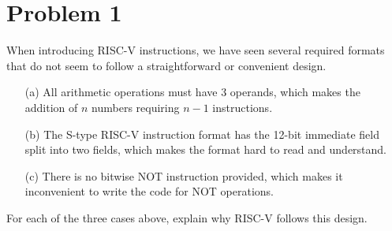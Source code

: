 \documentclass[12pt]{article}
\begin{document}
    \section*{Problem 1}
        \noindent When introducing RISC-V instructions, we have seen several
        required formats that do not seem to follow a straightforward or
        convenient design.
        \begin{itemize}
            \item[(a)] All arithmetic operations must have 3 operands, which
                makes the addition of $n$ numbers requiring $n-1$
                instructions.
            \item[(b)] The S-type RISC-V instruction format has the 12-bit
                immediate field split into two fields, which makes the format
                hard to read and understand.
            \item[(c)] There is no bitwise NOT instruction provided, which makes
                it inconvenient to write the code for NOT operations.
        \end{itemize}
        For each of the three cases above, explain why RISC-V follows this
        design.
\end{document}
